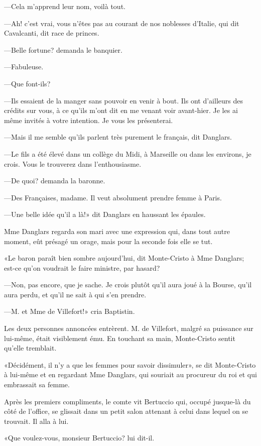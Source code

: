 —Cela m'apprend leur nom, voilà tout. 

—Ah! c'est vrai, vous n'êtes pas au courant de nos noblesses d'Italie, qui dit Cavalcanti, dit race de princes. 

—Belle fortune? demanda le banquier. 

—Fabuleuse. 

—Que font-ils? 

—Ils essaient de la manger sans pouvoir en venir à bout. Ils ont d'ailleurs des crédits sur vous, à ce qu'ils m'ont dit en me venant voir avant-hier. Je les ai même invités à votre intention. Je vous les présenterai. 

—Mais il me semble qu'ils parlent très purement le français, dit Danglars. 

—Le fils a été élevé dans un collège du Midi, à Marseille ou dans les environs, je crois. Vous le trouverez dans l'enthousiasme. 

—De quoi? demanda la baronne. 

—Des Françaises, madame. Il veut absolument prendre femme à Paris. 

—Une belle idée qu'il a là!» dit Danglars en haussant les épaules.  

Mme Danglars regarda son mari avec une expression qui, dans tout autre moment, eût présagé un orage, mais pour la seconde fois elle se tut. 

«Le baron paraît bien sombre aujourd'hui, dit Monte-Cristo à Mme Danglars; est-ce qu'on voudrait le faire ministre, par hasard? 

—Non, pas encore, que je sache. Je crois plutôt qu'il aura joué à la Bourse, qu'il aura perdu, et qu'il ne sait à qui s'en prendre. 

—M. et Mme de Villefort!» cria Baptistin. 

Les deux personnes annoncées entrèrent. M. de Villefort, malgré sa puissance sur lui-même, était visiblement ému. En touchant sa main, Monte-Cristo sentit qu'elle tremblait. 

«Décidément, il n'y a que les femmes pour savoir dissimuler», se dit Monte-Cristo à lui-même et en regardant Mme Danglars, qui souriait au procureur du roi et qui embrassait sa femme. 

Après les premiers compliments, le comte vit Bertuccio qui, occupé jusque-là du côté de l'office, se glissait dans un petit salon attenant à celui dans lequel on se trouvait. Il alla à lui. 

«Que voulez-vous, monsieur Bertuccio? lui dit-il. 

